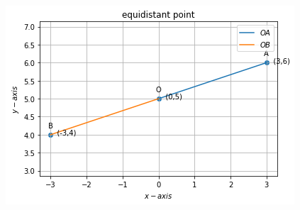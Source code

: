 \documentclass[12pt]{article}
\begin{document}
\begin{enumerate}
\begin{figure}[!h]
\begin{center}
  \includegraphics[width=\columnwidth]{./figs/fig.png}
 \end{center}
\caption{}
\label{fig:Fig1}
\end{figure}
\end{enumerate}
\end{document}
